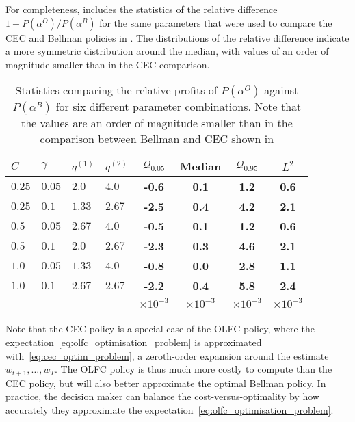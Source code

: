 \documentclass[main.tex]{subfiles}
\begin{document}
For completeness,  includes the statistics of the relative
difference $1-P(\alpha^O)/P(\alpha^B)$ for the same parameters
that were used to compare the CEC and Bellman policies in .
The distributions of the relative difference indicate a more symmetric
distribution around the median, with values of an order of magnitude
smaller than in the CEC comparison.
\begin{table}[htbp]
  \centering
  \begin{tabular}{llllcccc}
    \toprule
    $C$ & $\gamma$ & $q^{(1)}$ & $q^{(2)}$ & $\mathcal{Q}_{0.05}$
    &Median & $\mathcal{Q}_{0.95}$ &$L^2$\\
    \midrule
    $0.25$ & $0.05$ & $2.0$ & $4.0$
                                   & \textbf{-0.6} & \textbf{0.1} & \textbf{1.2} & \textbf{0.6} \\
    $0.25$ & $0.1$ & $1.33$ & $2.67$
                                   & \textbf{-2.5} & \textbf{0.4} & \textbf{4.2} & \textbf{2.1} \\
    $0.5$ & $0.05$ & $2.67$ & $4.0$
                                   & \textbf{-0.5} & \textbf{0.1} & \textbf{1.2} & \textbf{0.6} \\
    $0.5$ & $0.1$ & $2.0$ & $2.67$
                                   & \textbf{-2.3} & \textbf{0.3} & \textbf{4.6} & \textbf{2.1} \\
    $1.0$ & $0.05$ & $1.33$ & $4.0$
                                   & \textbf{-0.8} & \textbf{0.0} & \textbf{2.8} & \textbf{1.1} \\
    $1.0$ & $0.1$ & $2.67$ & $2.67$
                                   & \textbf{-2.2} & \textbf{0.4} & \textbf{5.8} & \textbf{2.4} \\
        &&&&$\times 10^{-3}$&$\times 10^{-3}$&$\times 10^{-3}$&$\times 10^{-3}$\\
    \bottomrule
  \end{tabular}
  \caption[Statistics comparing the profits of the Bellman and OLFC policies]{Statistics comparing the relative profits of $P(\alpha^O)$
    against $P(\alpha^B)$ for six different
    parameter combinations. Note that the values are an order of magnitude
    smaller than in the comparison between Bellman and CEC shown in
    }\label{tbl:paramcomparisons_olfc}
\end{table}

Note that the CEC policy is a special case of the OLFC policy, where the
expectation~\eqref{eq:olfc_optimisation_problem} is approximated with~\eqref{eq:cec_optim_problem}, a zeroth-order expansion around
the estimate $w_{t+1},\dots,w_T$.
The OLFC policy is thus much more costly to compute than the CEC policy, but will
also better approximate the optimal Bellman policy.
In practice, the
decision maker can balance the cost-versus-optimality by how
accurately they
approximate the expectation~\eqref{eq:olfc_optimisation_problem}.
\end{document}
